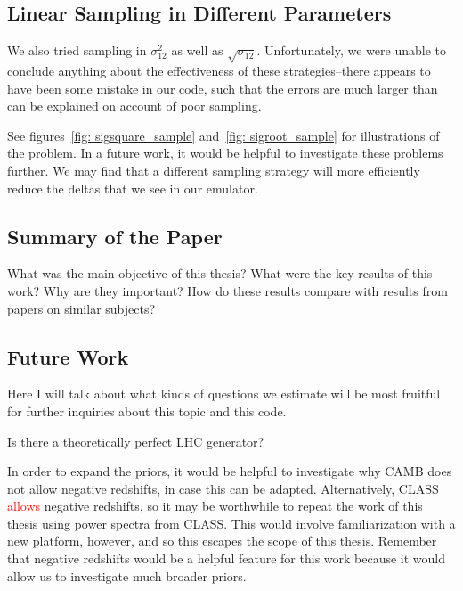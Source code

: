 \documentclass[11pt]{article}
\begin{document}
\begin{centering}
\subsection{Linear Sampling in Different Parameters}
\end{centering}

We also tried sampling in $\sigma_{12}^2$ as well as $\sqrt{\sigma_{12}}$.
Unfortunately, we were unable to conclude anything about the effectiveness of
these strategies--there appears to have been some mistake in our code, such
that the errors are much larger than can be explained on account of poor
sampling.

See figures~\ref{fig: sigsquare_sample} and~\ref{fig: sigroot_sample} for
illustrations of the problem. In a future work, it would be helpful to
investigate these problems further. We may find that a different sampling
strategy will more efficiently reduce the deltas that we see in our emulator.

\begin{centering}
\subsection{Summary of the Paper}
\end{centering}

What was the main objective of this thesis? What were the key results of this work? Why are they important? How do these results compare with results from papers on similar subjects?

\begin{centering}
\subsection{Future Work}
\label{sec: future_work}
\end{centering}

Here I will talk about what kinds of questions we estimate will be most fruitful for further inquiries about this topic and this code.

Is there a theoretically perfect LHC generator?

In order to expand the priors, it would be helpful to investigate why CAMB does not allow negative redshifts, in case this can be adapted. Alternatively, CLASS \textcolor{red}{allows} negative redshifts, so it may be worthwhile to repeat the work of this thesis using power spectra from CLASS. This would involve familiarization with a new platform, however, and so this escapes the scope of this thesis. Remember that negative redshifts would be a helpful feature for this work because it would allow us to investigate much broader priors.
\end{document}
